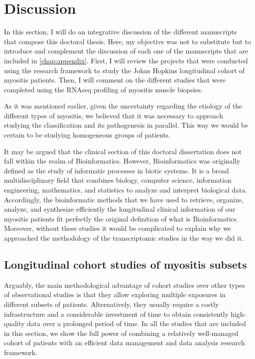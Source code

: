 \chapter{Discussion}

In this section, I will do an integrative discussion of the different manuscripts that compose this doctoral thesis. Here, my objective was not to substitute but to introduce and complement the discussion of each one of the manuscripts that are included in \autoref{chap:appendix}. First, I will review the projects that were conducted using the research framework to study the Johns Hopkins longitudinal cohort of myositis patients. Then, I will comment on the different studies that were completed using the RNAseq profiling of myositis muscle biopsies.

As it was mentioned earlier, given the uncertainty regarding the etiology of the different types of myositis, we believed that it was necessary to approach studying the classification and its pathogenesis in parallel. This way we would be certain to be studying homogeneous groups of patients.

It may be argued that the clinical section of this doctoral dissertation does not fall within the realm of Bioinformatics. However, Bioinformatics was originally defined as the study of informatic processes in biotic systems.\cite{Hogeweg1978} It is a broad multidisciplinary field that combines biology, computer science, information engineering, mathematics, and statistics to analyze and interpret biological data. Accordingly, the bioinformatic methods that we have used to retrieve, organize, analyze, and synthesize efficiently the longitudinal clinical information of our myositis patients fit perfectly the original definition of what is Bioinformatics. Moreover, without these studies it would be complicated to explain why we approached the methodology of the transcriptomic studies in the way we did it.

\section{Longitudinal cohort studies of myositis subsets}

Arguably, the main methodological advantage of cohort studies over other types of observational studies is that they allow exploring multiple exposures in different subsets of patients. Alternatively, they usually require a costly infrastructure and a considerable investment of time to obtain consistently high-quality data over a prolonged period of time. In all the studies that are included in this section, we show the full power of combining a relatively well-managed cohort of patients with an efficient data management and data analysis research framework.

